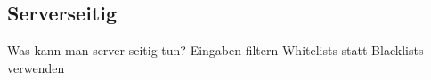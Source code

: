 \subsection{Serverseitig}
Was kann man server-seitig tun?
Eingaben filtern
Whitelists statt Blacklists verwenden